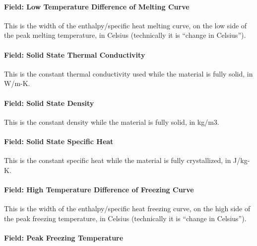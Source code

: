 \paragraph{Field: Low Temperature Difference of Melting Curve}\label{materialpropertyphasechangehysteresis-inputs-low-temperature-difference-of-melting-curve}

This is the width of the enthalpy/specific heat melting curve, on the low side of the peak melting temperature, in Celsius (technically it is ``change in Celsius'').

\paragraph{Field: Solid State Thermal Conductivity}\label{materialpropertyphasechangehysteresis-inputs-solidk}

This is the constant thermal conductivity used while the material is fully solid, in W/m-K.

\paragraph{Field: Solid State Density}\label{materialpropertyphasechangehysteresis-inputs-solidrho}

This is the constant density while the material is fully solid, in kg/m3.

\paragraph{Field: Solid State Specific Heat}\label{materialpropertyphasechangehysteresis-inputs-solid-state-specific-heat}

This is the constant specific heat while the material is fully crystallized, in J/kg-K.

\paragraph{Field: High Temperature Difference of Freezing Curve}\label{materialpropertyphasechangehysteresis-inputs-high-temperature-difference-of-freezing-curve}

This is the width of the enthalpy/specific heat freezing curve, on the high side of the peak freezing temperature, in Celsius (technically it is ``change in Celsius'').

\paragraph{Field: Peak Freezing Temperature}\label{materialpropertyphasechangehysteresis-inputs-peak-freezing-temperature}

